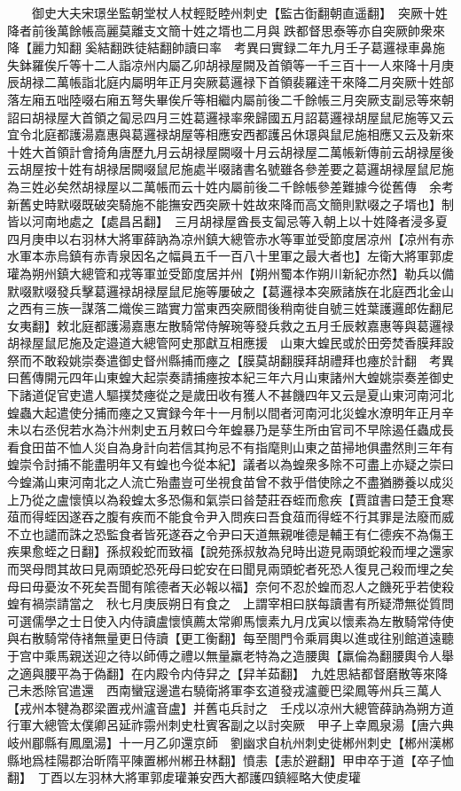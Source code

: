 　　御史大夫宋璟坐監朝堂杖人杖輕貶睦州刺史【監古衘翻朝直遥翻】　突厥十姓降者前後萬餘帳高麗莫離支文簡十姓之壻也二月與跌都督思泰等亦自突厥帥衆來降【麗力知翻奚結翻跌徒結翻帥讀曰率　考異曰實録二年九月壬子葛邏禄車鼻施失鉢羅俟斤等十二人詣凉州内屬乙卯胡禄屋闕及首領等一千三百十一人來降十月庚辰胡禄二萬帳詣北庭内屬明年正月突厥葛邏禄下首領裴羅逹干來降二月突厥十姓部落左廂五咄陸啜右廂五弩失畢俟斤等相繼内屬前後二千餘帳三月突厥支副忌等來朝詔曰胡禄屋大首領之匐忌四月三姓葛邏禄率衆歸國五月詔葛邏禄胡屋鼠尼施等又云宜令北庭都護湯嘉惠與葛邏禄胡屋等相應安西都護呂休璟與鼠尼施相應又云及新來十姓大首領計會掎角唐歷九月云胡禄屋闕啜十月云胡禄屋二萬帳新傳前云胡禄屋後云胡屋按十姓有胡禄居闕啜鼠尼施處半啜諸書名號雖各參差要之葛邏胡禄屋鼠尼施為三姓必矣然胡禄屋以二萬帳而云十姓内屬前後二千餘帳參差難據今從舊傳　余考新舊史時默啜既破突騎施不能撫安西突厥十姓故來降而高文簡則默啜之子壻也】制皆以河南地處之【處昌呂翻】　三月胡禄屋酋長支匐忌等入朝上以十姓降者浸多夏四月庚申以右羽林大將軍薛訥為凉州鎮大總管赤水等軍並受節度居凉州【凉州有赤水軍本赤烏鎮有赤青泉因名之幅員五千一百八十里軍之最大者也】左衛大將軍郭䖍瓘為朔州鎮大總管和戎等軍並受節度居并州【朔州蜀本作朔川新紀亦然】勒兵以備默啜默啜發兵擊葛邏禄胡禄屋鼠尼施等屢破之【葛邏禄本突厥諸族在北庭西北金山之西有三族一謀落二熾俟三踏實力當東西突厥間後稍南徙自號三姓葉護邏郎佐翻尼女夷翻】敕北庭都護湯嘉惠左散騎常侍解琬等發兵救之五月壬辰敕嘉惠等與葛邏禄胡禄屋鼠尼施及定邉道大總管阿史那獻互相應援　山東大蝗民或於田旁焚香膜拜設祭而不敢殺姚崇奏遣御史督州縣捕而瘞之【膜莫胡翻膜拜胡禮拜也瘞於計翻　考異曰舊傳開元四年山東蝗大起崇奏請捕瘞按本紀三年六月山東諸州大蝗姚崇奏差御史下諸道促官吏遣人驅撲焚瘞從之是歲田收有獲人不甚饑四年又云是夏山東河南河北蝗蟲大起遣使分捕而瘞之又實録今年十一月制以間者河南河北災蝗水潦明年正月辛未以右丞倪若水為汴州刺史五月敕曰今年蝗暴乃是孶生所由官司不早除遏任蟲成長看食田苗不恤人災自為身計向若信其拘忌不有指麾則山東之苗掃地俱盡然則三年有蝗崇令討捕不能盡明年又有蝗也今從本紀】議者以為蝗衆多除不可盡上亦疑之崇曰今蝗滿山東河南北之人流亡殆盡豈可坐視食苗曾不救乎借使除之不盡猶勝養以成災上乃從之盧懷慎以為殺蝗太多恐傷和氣崇曰㫺楚莊吞蛭而愈疾【賈誼書曰楚王食寒葅而得蛭因遂吞之腹有疾而不能食令尹入問疾曰吾食葅而得蛭不行其罪是法廢而威不立也譴而誅之恐監食者皆死遂吞之令尹曰天道無親唯德是輔王有仁德疾不為傷王疾果愈蛭之日翻】孫叔殺蛇而致福【說苑孫叔敖為兒時出遊見兩頭蛇殺而埋之還家而哭母問其故曰見兩頭蛇恐死母曰蛇安在曰聞見兩頭蛇者死恐人復見己殺而埋之矣母曰毋憂汝不死矣吾聞有隂德者天必報以福】奈何不忍於蝗而忍人之饑死乎若使殺蝗有禍崇請當之　秋七月庚辰朔日有食之　上謂宰相曰朕每讀書有所疑滯無從質問可選儒學之士日使入内侍讀盧懷慎薦太常卿馬懷素九月戊寅以懷素為左散騎常侍使與右散騎常侍禇無量更日侍讀【更工衡翻】每至閤門令乘肩輿以進或往别館道遠聽于宫中乘馬親送迎之待以師傅之禮以無量羸老特為之造腰輿【羸倫為翻腰輿令人舉之適與腰平為于偽翻】在内殿令内侍舁之【舁羊茹翻】　九姓思結都督磨散等來降己未悉除官遣還　西南蠻寇邊遣右驍衛將軍李玄道發戎瀘夔巴梁鳳等州兵三萬人【戎州本犍為郡梁置戎州瀘音盧】并舊屯兵討之　壬戍以凉州大總管薛訥為朔方道行軍大總管太僕卿呂延祚霛州刺史杜賓客副之以討突厥　甲子上幸鳳泉湯【唐六典岐州郿縣有鳳凰湯】十一月乙卯還京師　劉幽求自杭州刺史徙郴州刺史【郴州漢郴縣地爲桂陽郡治昕隋平陳置郴州郴丑林翻】憤恚【恚於避翻】甲申卒于道【卒子恤翻】　丁酉以左羽林大將軍郭䖍瓘兼安西大都護四鎮經略大使䖍瓘